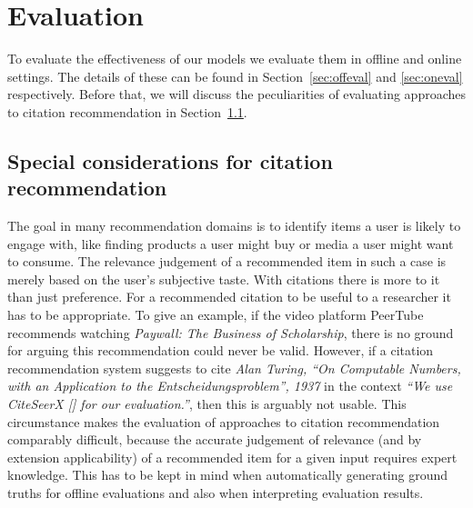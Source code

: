 \chapter{Evaluation}\label{chap:evaluation}
To evaluate the effectiveness of our models we evaluate them in offline and online settings. The details of these can be found in Section~\ref{sec:offeval} and \ref{sec:oneval} respectively. Before that, we will discuss the peculiarities of evaluating approaches to citation recommendation in Section~\ref{sec:citrecspecial}.

\section{Special considerations for citation recommendation}\label{sec:citrecspecial}
The goal in many recommendation domains is to identify items a user is likely to engage with, like finding products a user might buy or media a user might want to consume. The relevance judgement of a recommended item in such a case is merely based on the user's subjective taste.
With citations there is more to it than just preference. For a recommended citation to be useful to a researcher it has to be appropriate. To give an example, if the video platform PeerTube recommends watching \emph{Paywall: The Business of Scholarship}, there is no ground for arguing this recommendation could never be valid. However, if a citation recommendation system suggests to cite \emph{Alan Turing, ``On Computable Numbers, with an Application to the Entscheidungsproblem'', 1937} in the context \emph{``We use CiteSeerX [] for our evaluation.''}, then this is arguably not usable. This circumstance makes the evaluation of approaches to citation recommendation comparably difficult, because the accurate judgement of relevance (and by extension applicability) of a recommended item for a given input requires expert knowledge. This has to be kept in mind when automatically generating ground truths for offline evaluations and also when interpreting evaluation results.



